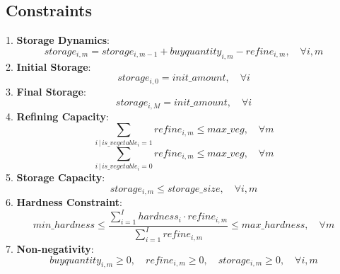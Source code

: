 \documentclass{article}
\begin{document}
\subsection*{Constraints}
1. \textbf{Storage Dynamics}:
\[
storage_{i,m} = storage_{i,m-1} + buyquantity_{i,m} - refine_{i,m}, \quad \forall i, m
\]
2. \textbf{Initial Storage}:
\[
storage_{i,0} = init\_amount, \quad \forall i
\]
3. \textbf{Final Storage}:
\[
storage_{i,M} = init\_amount, \quad \forall i
\]
4. \textbf{Refining Capacity}:
\[
\sum_{i \,|\, is\_vegetable_{i}=1} refine_{i,m} \leq max\_veg, \quad \forall m
\]
\[
\sum_{i \,|\, is\_vegetable_{i}=0} refine_{i,m} \leq max\_veg, \quad \forall m
\]
5. \textbf{Storage Capacity}:
\[
storage_{i,m} \leq storage\_size, \quad \forall i, m
\]
6. \textbf{Hardness Constraint}:
\[
min\_hardness \leq \frac{\sum_{i=1}^{I} hardness_{i} \cdot refine_{i,m}}{\sum_{i=1}^{I} refine_{i,m}} \leq max\_hardness, \quad \forall m
\]
7. \textbf{Non-negativity}:
\[
buyquantity_{i,m} \geq 0, \quad refine_{i,m} \geq 0, \quad storage_{i,m} \geq 0, \quad \forall i, m
\]
\end{document}
